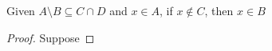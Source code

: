 
\begin{theorem}
  Given $A\setminus B \subseteq C \cap D$ and $x \in A$, if $x \notin C$, then $x
  \in B$
\end{theorem}

\begin{proof}
  Suppose
\end{proof}



\begin{align*}
\end{align*}
